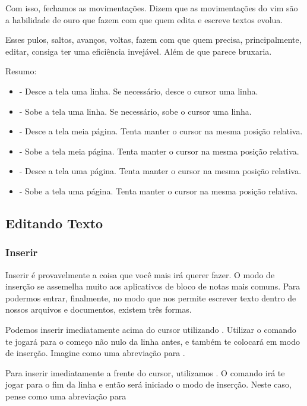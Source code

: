 \documentclass[a4paper, 12pt]{article}
\begin{document}
Com isso, fechamos as movimentações.
Dizem que as movimentações do vim são a habilidade de ouro que fazem com que quem edita e escreve textos evolua.

Esses pulos, saltos, avanços, voltas, fazem com que quem precisa, principalmente, editar, consiga ter uma eficiência invejável.
Além de que parece bruxaria.

Resumo:
\begin{itemize}
    \item {} - Desce a tela uma linha. Se necessário, desce o cursor uma linha.
    \item {} - Sobe a tela uma linha. Se necessário, sobe o cursor uma linha.
    \item {} - Desce a tela meia página. Tenta manter o cursor na mesma posição relativa.
    \item {} - Sobe a tela meia página. Tenta manter o cursor na mesma posição relativa.
    \item {} - Desce a tela uma página. Tenta manter o cursor na mesma posição relativa.
    \item {} - Sobe a tela uma página. Tenta manter o cursor na mesma posição relativa.
\end{itemize}

\subsection{Editando Texto}

\subsubsection{Inserir}
Inserir é provavelmente a coisa que você mais irá querer fazer.
O modo de inserção se assemelha muito aos aplicativos de bloco de notas mais comuns.
Para podermos entrar, finalmente, no modo que nos permite escrever texto dentro de nossos
arquivos e documentos, existem três formas.

Podemos inserir imediatamente acima do cursor utilizando .
Utilizar o comando  te jogará para o começo não nulo da linha antes,
e também te colocará em modo de inserção.
Imagine como uma abreviação para \vimcommand{\^}.

Para inserir imediatamente a frente do cursor, utilizamos .
O comando  irá te jogar para o fim da linha e então será iniciado o modo de inserção.
Neste caso, pense como uma abreviação para 
\end{document}

